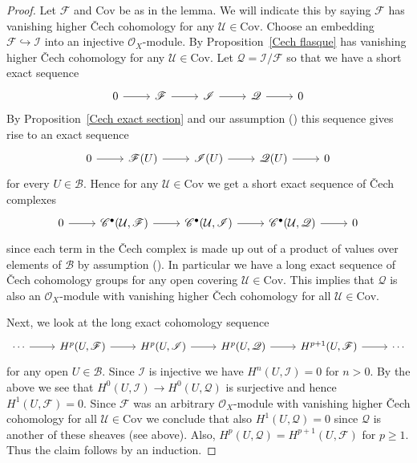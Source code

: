 \begin{proof}
Let $\mathscr{F}$ and $\mathrm{Cov}$ be as in the lemma. We will indicate this by saying $\mathscr{F}$ has vanishing higher \v{C}ech cohomology for any $\mathcal{U}\in\mathrm{Cov}$. Choose an embedding $\mathscr{F}\hookrightarrow\mathscr{I}$ into an injective $\mathscr{O}_X$-module. By Proposition~\ref{Cech flasque} has vanishing higher \v{C}ech cohomology for any $\mathcal{U}\in\mathrm{Cov}$. Let $\mathscr{Q}=\mathscr{I}/\mathscr{F}$ so that we have a short exact sequence
\[\begin{tikzcd}
0\ar[r]&\mathscr{F}\ar[r]&\mathscr{I}\ar[r]&\mathscr{Q}\ar[r]&0
\end{tikzcd}\]
By Proposition~\ref{Cech exact section} and our assumption () this sequence gives rise to an exact sequence
\[\begin{tikzcd}
0\ar[r]&\mathscr{F}(U)\ar[r]&\mathscr{I}(U)\ar[r]&\mathscr{Q}(U)\ar[r]&0
\end{tikzcd}\]
for every $U\in\mathcal{B}$. Hence for any $\mathcal{U}\in\mathrm{Cov}$ we get a short exact sequence of \v{C}ech complexes
\[\begin{tikzcd}
0\ar[r]&\mathscr{C}^\bullet(\mathcal{U},\mathscr{F})\ar[r]&\mathscr{C}^\bullet(\mathcal{U},\mathscr{I})\ar[r]&\mathscr{C}^\bullet(\mathcal{U},\mathscr{Q})\ar[r]&0
\end{tikzcd}\]
since each term in the \v{C}ech complex is made up out of a product of values over elements of $\mathcal{B}$ by assumption (). In particular we have a long exact sequence of \v{C}ech cohomology groups for any open covering $\mathcal{U}\in\mathrm{Cov}$. This implies that $\mathscr{Q}$ is also an $\mathscr{O}_X$-module with vanishing higher \v{C}ech cohomology for all $\mathcal{U}\in\mathrm{Cov}$.\par
Next, we look at the long exact cohomology sequence
\[\begin{tikzcd}
\cdots\ar[r]&H^p(U,\mathscr{F})\ar[r]&H^p(U,\mathscr{I})\ar[r]&H^p(U,\mathscr{Q})\ar[r]&H^{p+1}(U,\mathscr{F})\ar[r]&\cdots
\end{tikzcd}\]
for any open $U\in\mathcal{B}$. Since $\mathscr{I}$ is injective we have $H^n(U,\mathscr{I})=0$ for $n>0$. By the above we see that $H^0(U,\mathscr{I})\to H^0(U,\mathscr{Q})$ is surjective and hence $H^1(U,\mathscr{F})=0$. Since $\mathscr{F}$ was an arbitrary $\mathscr{O}_X$-module with vanishing higher \v{C}ech cohomology for all $\mathcal{U}\in\mathrm{Cov}$ we conclude that also $H^1(U,\mathscr{Q})=0$ since $\mathscr{Q}$ is another of these sheaves (see above). Also, $H^p(U,\mathscr{Q})=H^{p+1}(U,\mathscr{F})$ for $p\geq 1$. Thus the claim follows by an induction.
\end{proof}
